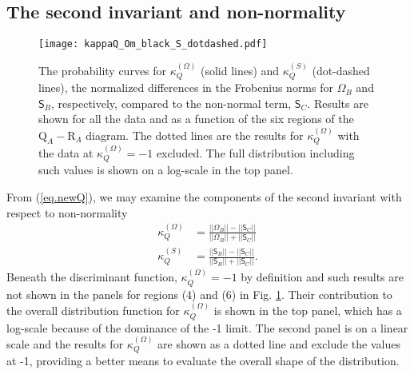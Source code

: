 \documentclass[preprint,amssymb,amsmath,aip,cha]{revtex4-1}
\begin{document}
\subsection{The second invariant and non-normality}
\label{sect.inv2}
\begin{figure}
\vspace*{2mm}
\begin{center}
\texttt{[image: kappaQ\_Om\_black\_S\_dotdashed.pdf]}
\end{center}
\caption{The probability curves for $\kappa_{Q}^{(\Omega)}$ (solid lines) and $\kappa_{Q}^{(S)}$ (dot-dashed lines), the normalized differences in the Frobenius norms for $\mathsf{\Omega}_{B}$ and $\mathsf{S}_{B}$, respectively, compared to the non-normal term, $\mathsf{S}_{C}$. Results are shown for all the data and as a function of the six regions of the $\mbox{Q}_{A}-\mbox{R}_{A}$ diagram. The dotted lines are the results for $\kappa_{Q}^{(\Omega)}$ with the data at $\kappa_{Q}^{(\Omega)} = -1$ excluded. The full distribution including such values is shown on a log-scale in the top panel.} 
\label{fig.kappaQ}
\end{figure}

From (\ref{eq.newQ}), we may examine the components of the second invariant with respect to non-normality
\begin{align}
\kappa_{Q}^{(\Omega)} &= \frac{||\mathsf{\Omega}_{B}|| - ||\mathsf{S}_{C}||}{||\mathsf{\Omega}_{B}|| + ||\mathsf{S}_{C}||} \\
\kappa_{Q}^{(S)} &= \frac{||\mathsf{S}_{B}|| - ||\mathsf{S}_{C}||}{||\mathsf{S}_{B}|| + ||\mathsf{S}_{C}||}.
\label{eq.kappaQ}
\end{align} 
Beneath the discriminant function, $\kappa_{Q}^{(\Omega)} = -1$ by definition and such results are not shown in the panels for regions (4) and (6) in Fig. \ref{fig.kappaQ}. Their contribution to the overall distribution function for $\kappa_{Q}^{(\Omega)}$ is shown in the top panel, which has a log-scale because of the dominance of the -1 limit. The second panel is on a linear scale and the results for $\kappa_{Q}^{(\Omega)}$ are shown as a dotted line and exclude the values at -1, providing a better means to evaluate the overall shape of the distribution.
\end{document}
